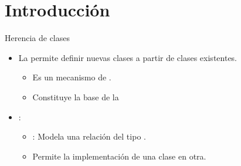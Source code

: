 \section{Introducción}

\begin{frame}[t]{Herencia de clases}
\begin{itemize}
  \item La  permite definir nuevas clases a partir de clases
        existentes.
    \begin{itemize}
      \item Es un mecanismo de .
      \item Constituye la base de la 
    \end{itemize}

  \item {}:
    \begin{itemize}

    \item {}:
          Modela una relación del tipo .

    \item {}
          Permite  la implementación de una clase en otra.

    \end{itemize}
\end{itemize}
\end{frame} 

